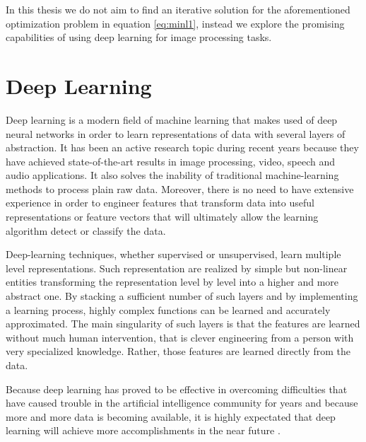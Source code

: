 In this thesis we do not aim to find an iterative solution for the aforementioned optimization problem in equation \ref{eq:minl1}, instead we explore the promising capabilities of using deep learning for image processing tasks.

\FloatBarrier

\section{Deep Learning}
Deep learning is a modern field of machine learning that makes used of deep neural networks in order to learn representations of data with several layers of abstraction. It has been an active research topic during recent years because they have achieved state-of-the-art results in image processing, video, speech and audio applications. It also solves the inability of traditional machine-learning methods to process plain raw data. Moreover, there is no need to have extensive experience in order to engineer features that transform data into useful representations or feature vectors that will ultimately allow the learning algorithm detect or classify the data. \

Deep-learning techniques, whether supervised or unsupervised, learn multiple level representations. Such representation are realized by simple but non-linear entities transforming the representation level by level into a higher and more abstract one. By stacking a sufficient number of such layers and by implementing a learning process, highly complex functions can be learned and accurately approximated. The main singularity of such layers is that the features are learned without much human intervention, that is clever engineering from a person with very specialized knowledge. Rather, those features are learned directly from the data.   \   

Because deep learning has proved to be effective in overcoming difficulties that have caused trouble in the artificial intelligence community for years and because more and more data is becoming available, it is highly expectated that deep learning will achieve more accomplishments in the near future \cite{lecun2015deep}. 

\FloatBarrier 

